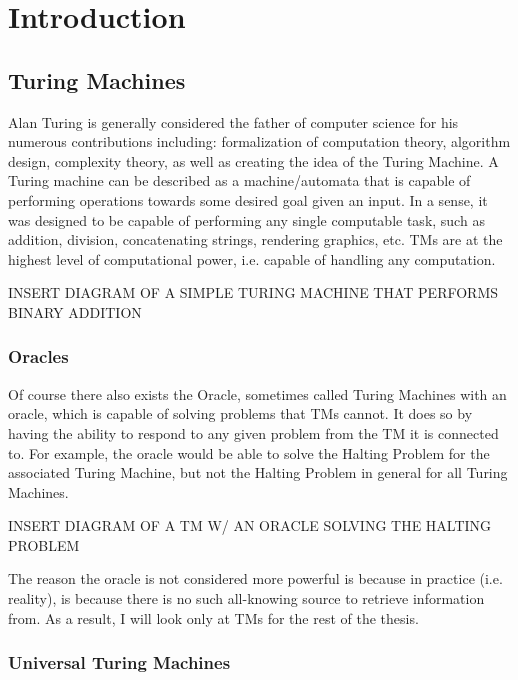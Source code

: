 \chapter{Introduction}

\section{Turing Machines}

Alan Turing is generally considered the father of computer science for his numerous contributions including: formalization of computation theory, algorithm design, complexity theory, as well as creating the idea of the Turing Machine.
A Turing machine can be described as a machine/automata that is capable of performing operations towards some desired goal given an input.
In a sense, it was designed to be capable of performing any single computable task, such as addition, division, concatenating strings, rendering graphics, etc.
TMs are at the highest level of computational power, i.e. capable of handling any computation.

INSERT DIAGRAM OF A SIMPLE TURING MACHINE THAT PERFORMS BINARY ADDITION

\subsection{Oracles}

Of course there also exists the Oracle, sometimes called Turing Machines with an oracle, which is capable of solving problems that TMs cannot.
It does so by having the ability to respond to any given problem from the TM it is connected to.
For example, the oracle would be able to solve the Halting Problem for the associated Turing Machine, but not the Halting Problem in general for all Turing Machines.

INSERT DIAGRAM OF A TM W/ AN ORACLE SOLVING THE HALTING PROBLEM

The reason the oracle is not considered more powerful is because in practice (i.e. reality), is because there is no such all-knowing source to retrieve information from.
As a result, I will look only at TMs for the rest of the thesis.

\subsection{Universal Turing Machines}

